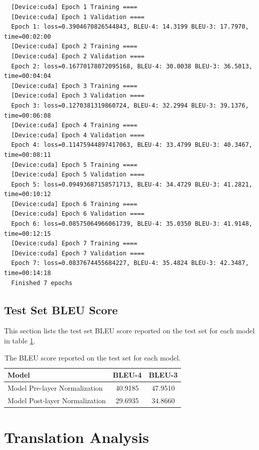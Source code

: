 \documentclass[11pt]{article}
\begin{document}
\begin{small}
\begin{verbatim}
  [Device:cuda] Epoch 1 Training ====
  [Device:cuda] Epoch 1 Validation ====
  Epoch 1: loss=0.3904670826544843, BLEU-4: 14.3199 BLEU-3: 17.7970, time=00:02:00
  [Device:cuda] Epoch 2 Training ====
  [Device:cuda] Epoch 2 Validation ====
  Epoch 2: loss=0.16770178072095168, BLEU-4: 30.0038 BLEU-3: 36.5013, time=00:04:04
  [Device:cuda] Epoch 3 Training ====
  [Device:cuda] Epoch 3 Validation ====
  Epoch 3: loss=0.1270381319860724, BLEU-4: 32.2994 BLEU-3: 39.1376, time=00:06:08
  [Device:cuda] Epoch 4 Training ====
  [Device:cuda] Epoch 4 Validation ====
  Epoch 4: loss=0.11475944897417063, BLEU-4: 33.4799 BLEU-3: 40.3467, time=00:08:11
  [Device:cuda] Epoch 5 Training ====
  [Device:cuda] Epoch 5 Validation ====
  Epoch 5: loss=0.09493687158571713, BLEU-4: 34.4729 BLEU-3: 41.2821, time=00:10:12
  [Device:cuda] Epoch 6 Training ====
  [Device:cuda] Epoch 6 Validation ====
  Epoch 6: loss=0.08575064966061739, BLEU-4: 35.0350 BLEU-3: 41.9148, time=00:12:15
  [Device:cuda] Epoch 7 Training ====
  [Device:cuda] Epoch 7 Validation ====
  Epoch 7: loss=0.0837674455684227, BLEU-4: 35.4824 BLEU-3: 42.3487, time=00:14:18
  Finished 7 epochs
\end{verbatim}
\end{small}


\subsection{Test Set BLEU Score}
This section lists the test set BLEU score reported on the test set for each model in table \ref{tab:bleu}.
\begin{table}[h]
\centering
\begin{tabular}{lcc} \toprule
Model                          & BLEU-4 &  BLEU-3 \\ \midrule
Model Pre-layer Normalization  & 40.9185 & 47.9510    \\
Model Post-layer Normalization & 29.6935 & 34.8660    \\
\bottomrule
\end{tabular}
\caption{The BLEU score reported on the test set for each model.}
\label{tab:bleu}
\end{table}

\newpage
\section{Translation Analysis}
\end{document}
